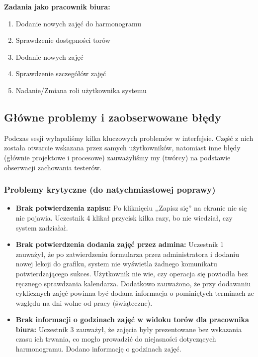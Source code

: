 \documentclass[a4paper,12pt]{article}
\begin{document}
\vspace{0.3cm}
\noindent\textbf{Zadania jako pracownik biura:}
\begin{enumerate}
    \item Dodanie nowych zajęć do harmonogramu
    \item Sprawdzenie dostępności torów
    \item Dodanie nowych zajęć
    \item Sprawdzenie szczegółów zajęć
    \item Nadanie/Zmiana roli użytkownika systemu
\end{enumerate}
 
\subsection{Główne problemy i zaobserwowane błędy}
 
Podczas sesji wyłapaliśmy kilka kluczowych problemów w interfejsie. Część z nich została otwarcie wskazana przez samych użytkowników, natomiast inne błędy (głównie projektowe i procesowe) zauważyliśmy my (twórcy) na podstawie obserwacji zachowania testerów.
 
\subsubsection*{Problemy krytyczne (do natychmiastowej poprawy)}
 
\begin{itemize}
    \item \textbf{Brak potwierdzenia zapisu:} Po kliknięciu ,,Zapisz się'' na ekranie nic się nie pojawia. Uczestnik 4 klikał przycisk kilka razy, bo nie wiedział, czy system zadziałał.
 
    \item \textbf{Brak potwierdzenia dodania zajęć przez admina:} Uczestnik 1 zauważył, że po zatwierdzeniu formularza przez administratora i dodaniu nowej lekcji do grafiku, system nie wyświetla żadnego komunikatu potwierdzającego sukces. Użytkownik nie wie, czy operacja się powiodła bez ręcznego sprawdzania kalendarza. Dodatkowo zauważono, że przy dodawaniu cyklicznych zajęć powinna być dodana informacja o pominiętych terminach ze względu na dni wolne od pracy (świąteczne).
 
    \item \textbf{Brak informacji o godzinach zajęć w widoku torów dla pracownika biura:} Uczestnik 3 zauważył, że zajęcia były prezentowane bez wskazania czasu ich trwania, co mogło prowadzić do niejasności dotyczących harmonogramu. Dodano informację o godzinach zajęć.
\end{itemize}
 
\end{document}
